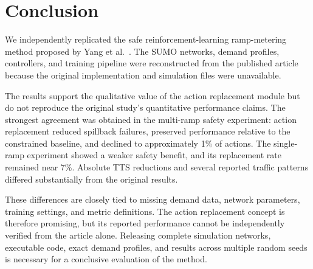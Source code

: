 \section{Conclusion}
\label{sec:conclusion}

We independently replicated the safe reinforcement-learning ramp-metering method proposed by Yang et al.~\cite{Yang2025Reinforcement}. The SUMO networks, demand profiles, controllers, and training pipeline were reconstructed from the published article because the original implementation and simulation files were unavailable.

The results support the qualitative value of the action replacement module but do not reproduce the original study's quantitative performance claims. The strongest agreement was obtained in the multi-ramp safety experiment: action replacement reduced spillback failures, preserved performance relative to the constrained baseline, and declined to approximately 1\% of actions. The single-ramp experiment showed a weaker safety benefit, and its replacement rate remained near 7\%. Absolute TTS reductions and several reported traffic patterns differed substantially from the original results.

These differences are closely tied to missing demand data, network parameters, training settings, and metric definitions. The action replacement concept is therefore promising, but its reported performance cannot be independently verified from the article alone. Releasing complete simulation networks, executable code, exact demand profiles, and results across multiple random seeds is necessary for a conclusive evaluation of the method.









